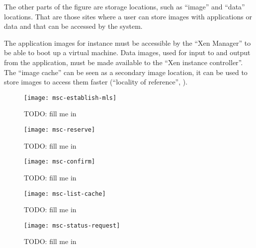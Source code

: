 The other parts of the figure are storage locations, such as ``image'' and
``data'' locations.   That are those sites  where a user  can store images
with applications  or data  and that  can be accessed  by the  system.

The  application images  for  instance  must be  accessible  by the  ``Xen
Manager'' to be able to boot  up a virtual machine.  Data images, used for
input to  and output from the  application, must be made  available to the
``Xen  instance  controller''.  The  ``image  cache''  can  be seen  as  a
secondary image  location, it can be  used to store images  to access them
faster (``locality of reference'', \cite{locality-principle}).

\begin{figure}
  \begin{center}
    \texttt{[image: msc-establish-mls]}
  \end{center}
  \caption[MSC Message Layer Security]{TODO: fill me in}
  \label{fig:msc-establish-mls}
\end{figure}

\begin{figure}
  \begin{center}
    \texttt{[image: msc-reserve]}
  \end{center}
  \caption[MSC Make Reservation]{TODO: fill me in}
  \label{fig:msc-reserve}
\end{figure}

\begin{figure}
  \begin{center}
    \texttt{[image: msc-confirm]}
  \end{center}
  \caption[MSC Confirm Reservation]{TODO: fill me in}
  \label{fig:msc-confirm}
\end{figure}

\begin{figure}
  \begin{center}
    \texttt{[image: msc-list-cache]}
  \end{center}
  \caption[MSC List Cache Entries]{TODO: fill me in}
  \label{fig:msc-list-cache}
\end{figure}

\begin{figure}
  \begin{center}
    \texttt{[image: msc-status-request]}
  \end{center}
  \caption[MSC Request Task Status]{TODO: fill me in}
  \label{fig:msc-status-request}
\end{figure}

